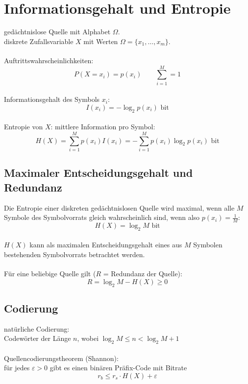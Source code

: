 \chapter{Informationsgehalt und Entropie}
gedächtnislose Quelle mit Alphabet $\Omega$.\\
diskrete Zufallsvariable $X$ mit Werten $\Omega = \lbrace x_1,\ldots,x_m \rbrace$.\\\\
Auftrittswahrscheinlichkeiten:
\[ P(X=x_i) = p(x_i) \qquad \sum_{i=1}^{M} = 1 \]
~\\Informationsgehalt des Symbols $x_i$:
\[ I(x_i) = -\log_2p(x_i) \textrm{ bit} \]
~\\Entropie von $X$: mittlere Information pro Symbol:
\[ H(X) = \sum_{i=1}^{M}p(x_i)I(x_i) = -\sum_{i=1}^{M}p(x_i)\log_2p(x_i) \textrm{ bit} \]

\section{Maximaler Entscheidungsgehalt und Redundanz}
Die Entropie einer diskreten gedächtnislosen Quelle wird maximal,
wenn alle $M$ Symbole des Symbolvorrats gleich wahrscheinlich sind,
wenn also $p(x_i)=\frac{1}{M}$:
\[ H(X) = \log_2M \textrm{ bit} \]
~\\$H(X)$ kann als maximalen Entscheidungsgehalt eines aus $M$ Symbolen bestehenden
Symbolvorrats betrachtet werden.\\\\
Für eine beliebige Quelle gilt ($R$ = Redundanz der Quelle):
\[ R = \log_2M-H(X) \geq 0 \]

\section{Codierung}
natürliche Codierung:
\\Codewörter der Länge $n$, wobei $\log_2M \leq n < \log_2M+1$
\\\\
Quellencodierungstheorem (Shannon):
\\für jedes $\varepsilon > 0$ gibt es einen binären Präfix-Code mit Bitrate
\[ r_b \leq r_s \cdot H(X) + \varepsilon \]

